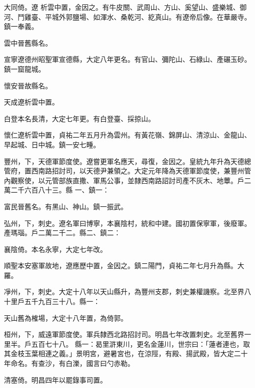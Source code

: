\begin{pinyinscope}
 大同倚。遼
 析雲中置，金因之。有牛皮關、武周山、方山、奚望山、盛樂城、御河、鬥雞臺、平城外郭鹽場、如渾水、桑乾河、紇真山。有遼帝后像。在華嚴寺。鎮一奉義。



 雲中晉舊縣名。



 宣寧遼德州昭聖軍宣德縣，大定八年更名。有官山、彌陀山、石綠山、產碾玉砂。鎮一窟龍城。



 懷安晉故縣名。



 天成遼析雲中置。



 白登本名長清，大定七年更。有白登臺、採掠山。



 懷仁遼析雲中置，貞祐二年五月升為雲州。有黃花嶺、錦屏山、清涼山、金龍山、早起城、日中城。鎮一安七畽。



 豐州，下，天德軍節度使。遼嘗更軍名應天，尋復，金因之。皇統九年升為天德總管府，置西南路招討司，以天德尹兼領之。大定元年降為天德軍節度使，兼豐州管內觀察使，以元管部族直撒、軍馬公事，並隸西南路詔討司產不灰木、地蕈。戶二萬二千六百八十三。縣
 一、鎮一：



 富民晉舊名。有黑山、神山。鎮一振武。



 弘州，下，刺史。遼名軍曰博寧，本襄陰村，統和中建。國初置保寧軍，後廢軍。產瑪瑙。戶二萬二千二。縣二、鎮二：



 襄陰倚。本名永寧，大定七年改。



 順聖本安塞軍故地，遼應歷中置，金因之。鎮二陽門，貞祐二年七月升為縣。大羅。



 凈州，下，刺史。大定十八年以天山縣升，為豐州支郡，刺史兼權譏察。北至界八十里戶五千九百三十八。縣一：



 天山舊為榷場，大定十八年置，為倚郭。



 桓州，下，威遠軍節度使。軍兵隸西北路招討司。明昌七年改置刺史。北至舊界一里半。戶五百七十八。
 縣一：曷里滸東川，更名金蓮川，世宗曰：「蓮者連也，取其金枝玉葉相連之義。」景明宮，避暑宮也，在涼陘，有殿、揚武殿，皆大定二十年命名。有查沙，有白濼，國言曰勺赤勒。



 清塞倚。明昌四年以罷錄事司置。




\end{pinyinscope}

